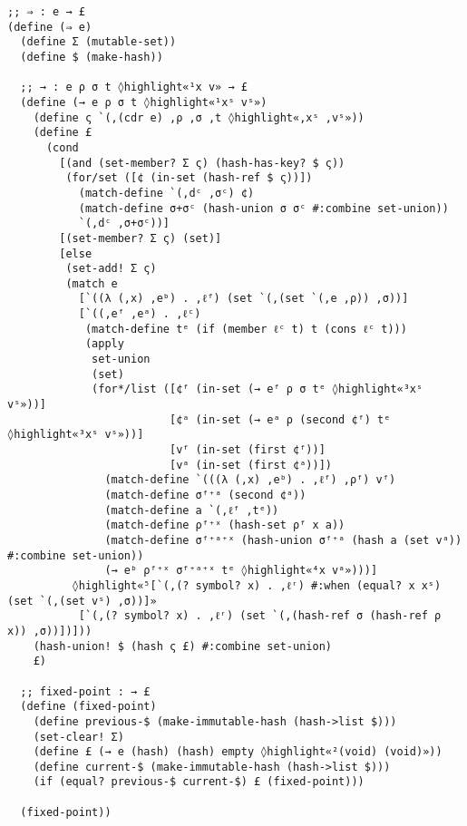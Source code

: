 \documentclass[12pt, oneside]{book}
\begin{document}
\begin{Verbatim}
;; ⇒ : e → £
(define (⇒ e)
  (define Σ (mutable-set))
  (define $ (make-hash))

  ;; → : e ρ σ t ◊highlight«¹x v» → £
  (define (→ e ρ σ t ◊highlight«¹xˢ vˢ»)
    (define ς `(,(cdr e) ,ρ ,σ ,t ◊highlight«,xˢ ,vˢ»))
    (define £
      (cond
        [(and (set-member? Σ ς) (hash-has-key? $ ς))
         (for/set ([¢ (in-set (hash-ref $ ς))])
           (match-define `(,dᶜ ,σᶜ) ¢)
           (match-define σ+σᶜ (hash-union σ σᶜ #:combine set-union))
           `(,dᶜ ,σ+σᶜ))]
        [(set-member? Σ ς) (set)]
        [else
         (set-add! Σ ς)
         (match e
           [`((λ (,x) ,eᵇ) . ,ℓᶠ) (set `(,(set `(,e ,ρ)) ,σ))]
           [`((,eᶠ ,eᵃ) . ,ℓᶜ)
            (match-define tᵉ (if (member ℓᶜ t) t (cons ℓᶜ t)))
            (apply
             set-union
             (set)
             (for*/list ([¢ᶠ (in-set (→ eᶠ ρ σ tᵉ ◊highlight«³xˢ vˢ»))]
                         [¢ᵃ (in-set (→ eᵃ ρ (second ¢ᶠ) tᵉ ◊highlight«³xˢ vˢ»))]
                         [vᶠ (in-set (first ¢ᶠ))]
                         [vᵃ (in-set (first ¢ᵃ))])
               (match-define `(((λ (,x) ,eᵇ) . ,ℓᶠ) ,ρᶠ) vᶠ)
               (match-define σᶠ⁺ᵃ (second ¢ᵃ))
               (match-define a `(,ℓᶠ ,tᵉ))
               (match-define ρᶠ⁺ˣ (hash-set ρᶠ x a))
               (match-define σᶠ⁺ᵃ⁺ˣ (hash-union σᶠ⁺ᵃ (hash a (set vᵃ)) #:combine set-union))
               (→ eᵇ ρᶠ⁺ˣ σᶠ⁺ᵃ⁺ˣ tᵉ ◊highlight«⁴x vᵃ»)))]
          ◊highlight«⁵[`(,(? symbol? x) . ,ℓʳ) #:when (equal? x xˢ) (set `(,(set vˢ) ,σ))]»
           [`(,(? symbol? x) . ,ℓʳ) (set `(,(hash-ref σ (hash-ref ρ x)) ,σ))])]))
    (hash-union! $ (hash ς £) #:combine set-union)
    £)

  ;; fixed-point : → £
  (define (fixed-point)
    (define previous-$ (make-immutable-hash (hash->list $)))
    (set-clear! Σ)
    (define £ (→ e (hash) (hash) empty ◊highlight«²(void) (void)»))
    (define current-$ (make-immutable-hash (hash->list $)))
    (if (equal? previous-$ current-$) £ (fixed-point)))

  (fixed-point))
\end{Verbatim}
\end{document}
